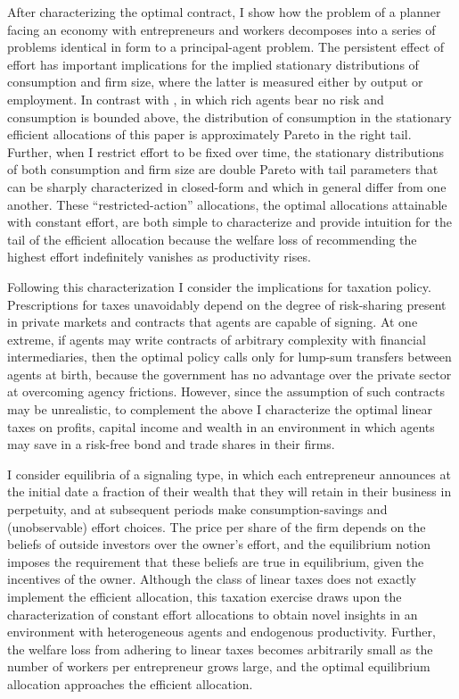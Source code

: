 \documentclass[11pt]{article}
\theoremstyle{plain}
\begin{document}
After characterizing the optimal contract, I show how the problem of a planner facing an economy with entrepreneurs and workers decomposes into a series of problems identical in form to a principal-agent problem. The persistent effect of effort has important implications for the implied stationary distributions of consumption and firm size, where the latter is measured either by output or employment. In contrast with \cite{sannikov_continuous-time_2008}, in which rich agents bear no risk and consumption is bounded above, the distribution of consumption in the stationary efficient allocations of this paper is approximately Pareto in the right tail. Further, when I restrict effort to be fixed over time, the stationary distributions of both consumption and firm size are double Pareto with tail parameters that can be sharply characterized in closed-form and which in general differ from one another. These ``restricted-action'' allocations, the optimal allocations attainable with constant effort, are both simple to characterize and provide intuition for the tail of the efficient allocation because the welfare loss of recommending the highest effort indefinitely vanishes as productivity rises. 


Following this characterization I consider the implications for taxation policy. Prescriptions for taxes unavoidably depend on the degree of risk-sharing present in private markets and contracts that agents are capable of signing. At one extreme, if agents may write contracts of arbitrary complexity with financial intermediaries, then the optimal policy calls only for lump-sum transfers between agents at birth, because the government has no advantage over the private sector at overcoming agency frictions. However, since the assumption of such contracts may be unrealistic, to complement the above I characterize the optimal linear taxes on profits, capital income and wealth in an environment in which agents may save in a risk-free bond and trade shares in their firms. 


I consider equilibria of a signaling type, in which each entrepreneur announces at the initial date a fraction of their wealth that they will retain in their business in perpetuity, and at subsequent periods make consumption-savings and (unobservable) effort choices. The price per share of the firm depends on the beliefs of outside investors over the owner's effort, and the equilibrium notion imposes the requirement that these beliefs are true in equilibrium, given the incentives of the owner. Although the class of linear taxes does not exactly implement the efficient allocation, this taxation exercise draws upon the characterization of constant effort allocations to obtain novel insights in an environment with heterogeneous agents and endogenous productivity. Further, the welfare loss from adhering to linear taxes becomes arbitrarily small as the number of workers per entrepreneur grows large, and the optimal equilibrium allocation approaches the efficient allocation. 
\end{document}
